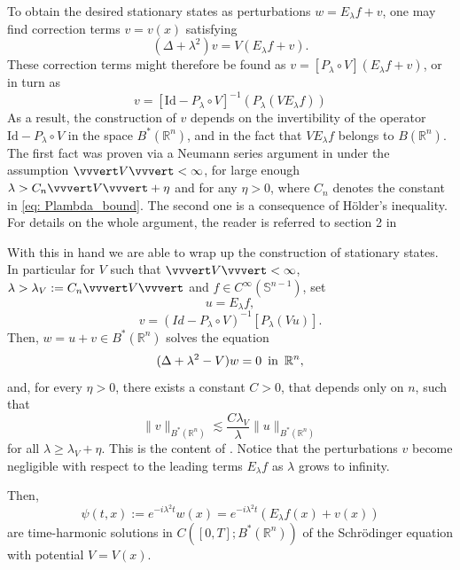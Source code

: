 \documentclass[10pt,a4paper]{amsart}
\theoremstyle{remark}
\theoremstyle{definition}
\newcommand{\R}{\mathbb{R}}
\newcommand{\Sph}{\mathbb{S}}
\newcommand{\Id}{\mathrm{Id}}
\def\lec{\lesssim}
\begin{document}
To obtain the desired stationary states as perturbations $w=E_\lambda f + v$, one may find correction terms $v=v(x)$ satisfying 
%
\[
(\Delta + \lambda^2)v = V(E_\lambda f +v).
\]
% 
These correction terms might therefore be found as $v=\left[P_\lambda\circ V\right] (E_\lambda f +v)$, or in turn as
%
\[
v = \left[\Id-P_\lambda \circ V\right]^{-1} \left(P_\lambda \left(V E_\lambda f\right)\right)
\] 
%
As a result, the construction of $v$ depends on the invertibility of the operator $\Id-P_\lambda \circ V$ in the space $B^*(\R^n)$, and in the fact that $V E_\lambda f$ belongs to $B(\R^n)$. 
The first fact was proven via a Neumann series argument in \cite[Corollary 2.4]{zbMATH08122191} under the assumption $\vvvert V\vvvert<\infty$, for large enough $\lambda > C_n \vvvert V \vvvert + \eta$ and for any $\eta>0$, where $C_n$ denotes the constant in \eqref{eq: Plambda_bound}. The second one is a consequence of H\"older's inequality. For details on the whole argument, the reader is referred to section 2 in \cite{zbMATH08122191}

With this in hand we are able to wrap up the construction of stationary states. In particular for $V$ such that $\vvvert V \vvvert<
\infty$, $\lambda > \lambda_V := C_n \vvvert V \vvvert$ and $f\in C^\infty(\Sph^{n-1})$, set 
%
\[
u= E_\lambda f, 
\]
%
\[
v=(Id-P_\lambda\circ V)^{-1} [P_\lambda (Vu)]. 
\]
%
Then, $w= u+v \in B^*(\R^n)$ solves the equation 
%
\[
(\Delta + \lambda^2 - V)w=0 \,\, \, \textup{in} \,\,\, \R^n, 
\]
%
and, for every $\eta>0$, there exists a constant $C>0$, that depends only on $n$, such that 
%
\[
\|v\|_{B^*(\R^n)} \lec \frac{ C \lambda_V}{\lambda} \| u \|_{B^*(\R^n)}
\]
%
for all $\lambda \geq \lambda_V+\eta$. 
This is the content of \cite[Proposition 2.5]{zbMATH08122191}. Notice that the perturbations $v$ become negligible with respect to the leading terms $E_\lambda f$ as $\lambda $ grows to infinity. 


Then,
%
\begin{equation}\label{eq: time-harmonic solutions}
\psi(t, x):= e^{-i\lambda^2t} w(x)=e^{-i\lambda^2t}(E_\lambda f (x) + v(x))
\end{equation}
%
are time-harmonic solutions in $C([0, T];B^*(\R^n))$ of the Schr\"odinger equation with potential $V=V(x)$. 
%


\end{document}
